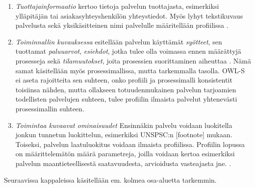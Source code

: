 \documentclass[finnish]{tktltiki2}
\theoremstyle{definition}
\theoremstyle{remark}
\begin{document}
\begin{enumerate}
 \item \textit{Tuottajainformaatio} kertoo tietoja palvelun tuottajasta, esimerkiksi ylläpitäjän tai asiakasyhteyshenkilön yhteystiedot. Myös lyhyt tekstikuvaus palvelusta sekä yksikäsitteinen nimi palvelulle määritellään profiilissa\cite{OWLS} .
 
 \item \textit{Toiminnallin kuvauksessa} esitellään palvelun käyttämät \textit{syötteet}, sen tuottamat \textit{paluuarvot}, \textit{esiehdot}, jotka tulee olla voimassa ennen määrättyjä
 prosesseja sekä \textit{tilamuutokset}, joita prosessien suorittaminen aiheuttaa \cite{OWLS}. Nämä samat käsitellään myös prosessimallissa, mutta tarkemmalla tasolla. OWL-S ei aseta
 rajoitteita sen suhteen, onko profiili ja prosessimalli konsistentit toisiinsa nähden, mutta ollakseen totuudenmukainen palvelun tarjoamien todellisten palvelujen suhteen, tulee profiilin ilmaista
 palvelut yhtenevästi prosessimallin suhteen\cite{OWLS}. 
 
 \item \textit{Toimintaa kuvaavat ominaisuudet} Ensinnäkin palvelu voidaan luokitella jonkun tunnetun luokittelun, esimerkiksi UNSPSC:n [footnote] mukaan. Toiseksi, palvelun laatuluokitus voidaan 
 ilmaista profiilissa. Profiilin lopussa on määrittelemätön määrä parametreja, joilla voidaan kertoa esimerkiksi palvelun maantieteellisestä saatavuudesta, arvioidusta vasteajasta jne. \cite{OWLS}.
\end{enumerate}

Seuraavissa kappaleissa käsitellään em. kolmea osa-aluetta tarkemmin. 


% 
% 
% 
% 
\end{document}
